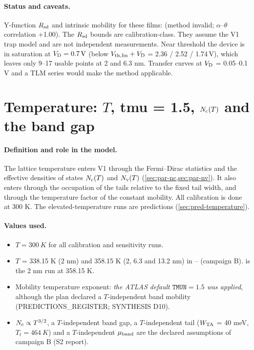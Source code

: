 \paragraph{Status and caveats.}
Y-function $R_{\mathrm{sd}}$ and intrinsic mobility for these films:  (method invalid; $\alpha$--$\theta$ correlation +1.00). The $R_{\mathrm{sd}}$ bounds are calibration-class. They assume the V1 trap model and are not independent measurements. Near threshold the device is in saturation at $V_{\mathrm{D}}=\SI{0.7}{V}$ (below $V_{\mathrm{th,lin}}+V_{\mathrm{D}}$ = 2.36 / 2.52 / 1.74\,V), which leaves only 9--17 usable points at 2 and 6.3 nm. Transfer curves at $V_{\mathrm{D}}$ = 0.05--0.1\,V and a TLM series would make the method applicable.

\section{Temperature: \texorpdfstring{$T$}{T}, tmu = 1.5, \texorpdfstring{$N_{\mathrm{c}}(T)$}{Nc(T)} and the band gap}\label{sec:par-temperature}

\paragraph{Definition and role in the model.}
The lattice temperature enters V1 through the Fermi--Dirac statistics and the effective densities of states $N_{\mathrm{c}}(T)$ and $N_{\mathrm{v}}(T)$ (\cref{sec:par-nc,sec:par-nv}). It also enters through the occupation of the tails relative to the fixed tail width, and through the temperature factor of the constant mobility. All calibration is done at 300 K. The elevated-temperature runs are predictions (\cref{sec:pred-temperature}).

\paragraph{Values used.}
\begin{itemize}
\item $T=\SI{300}{K}$ for all calibration and sensitivity runs.
\item $T$ = 338.15 K (2 nm) and 358.15 K (2, 6.3 and 13.2 nm) in -- (campaign B).  is the 2 nm run at 358.15 K.
\item Mobility temperature exponent: \emph{the ATLAS default $\texttt{TMUN}=1.5$ was applied}, although the plan declared a $T$-independent band mobility (PREDICTIONS\_REGISTER; SYNTHESIS D10).
\item $N_{\mathrm{c}}\propto T^{3/2}$, a $T$-independent band gap, a $T$-independent tail ($W_{\mathrm{TA}}$ = 40 meV, $T_t=\SI{464}{K}$) and a $T$-independent $\mu_{\mathrm{band}}$ are the declared assumptions of campaign B (S2 report).
\end{itemize}

